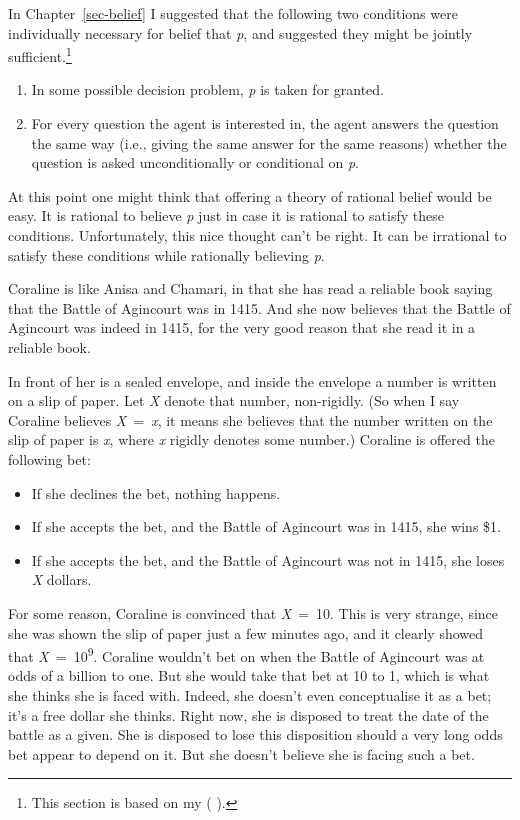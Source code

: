 \documentclass[
  10pt,
  letterpaper,
  twoside]{scrbook}
\providecommand{\tightlist}{%
  \setlength{\itemsep}{0pt}\setlength{\parskip}{0pt}}\usepackage{longtable,booktabs,array}
\begin{document}
In Chapter~\ref{sec-belief} I suggested that the following two
conditions were individually necessary for belief that \emph{p}, and
suggested they might be jointly sufficient.\footnote{This section is
  based on my ( ).}

\begin{enumerate}
\def\labelenumi{\arabic{enumi}.}
\tightlist
\item
  In some possible decision problem, \emph{p} is taken for granted.
\item
  For every question the agent is interested in, the agent answers the
  question the same way (i.e., giving the same answer for the same
  reasons) whether the question is asked unconditionally or conditional
  on \emph{p}.
\end{enumerate}

At this point one might think that offering a theory of rational belief
would be easy. It is rational to believe \emph{p} just in case it is
rational to satisfy these conditions. Unfortunately, this nice thought
can't be right. It can be irrational to satisfy these conditions while
rationally believing \emph{p}.

Coraline is like Anisa and Chamari, in that she has read a reliable book
saying that the Battle of Agincourt was in 1415. And she now believes
that the Battle of Agincourt was indeed in 1415, for the very good
reason that she read it in a reliable book.

In front of her is a sealed envelope, and inside the envelope a number
is written on a slip of paper. Let \emph{X} denote that number,
non-rigidly. (So when I say Coraline believes \emph{X}~=~\emph{x}, it
means she believes that the number written on the slip of paper is
\emph{x}, where \emph{x} rigidly denotes some number.) Coraline is
offered the following bet:

\begin{itemize}
\tightlist
\item
  If she declines the bet, nothing happens.
\item
  If she accepts the bet, and the Battle of Agincourt was in 1415, she
  wins \$1.
\item
  If she accepts the bet, and the Battle of Agincourt was not in 1415,
  she loses \emph{X} dollars.
\end{itemize}

For some reason, Coraline is convinced that \emph{X}~=~10. This is very
strange, since she was shown the slip of paper just a few minutes ago,
and it clearly showed that \emph{X}~=~10\textsuperscript{9}. Coraline
wouldn't bet on when the Battle of Agincourt was at odds of a billion to
one. But she would take that bet at 10 to 1, which is what she thinks
she is faced with. Indeed, she doesn't even conceptualise it as a bet;
it's a free dollar she thinks. Right now, she is disposed to treat the
date of the battle as a given. She is disposed to lose this disposition
should a very long odds bet appear to depend on it. But she doesn't
believe she is facing such a bet.
\end{document}
